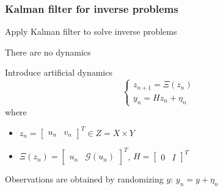 \begin{frame}
\frametitle{Kalman filter for inverse problems}
\begin{greenblock}
Apply Kalman filter to solve inverse problems
\end{greenblock}
\begin{redblock}[Issue]
There are no dynamics
\end{redblock}
Introduce artificial dynamics
\begin{equation*}
\begin{cases}
z_{n+1} = \Xi(z_n) \\
y_{n} = H z_n + \eta_n
\end{cases}
\end{equation*}
where
\begin{itemize}
\item $z_n = \begin{bmatrix} u_n & v_n \end{bmatrix}^T \in Z = X \times Y$
\item $\Xi(z_n) = \begin{bmatrix} u_n & \mathcal{G}(u_n) \end{bmatrix}^T$, $H = \begin{bmatrix} 0 & I \end{bmatrix}^T$
\end{itemize}
Observations are obtained by randomizing $y$: $y_n = y + \eta_n$
\end{frame}

